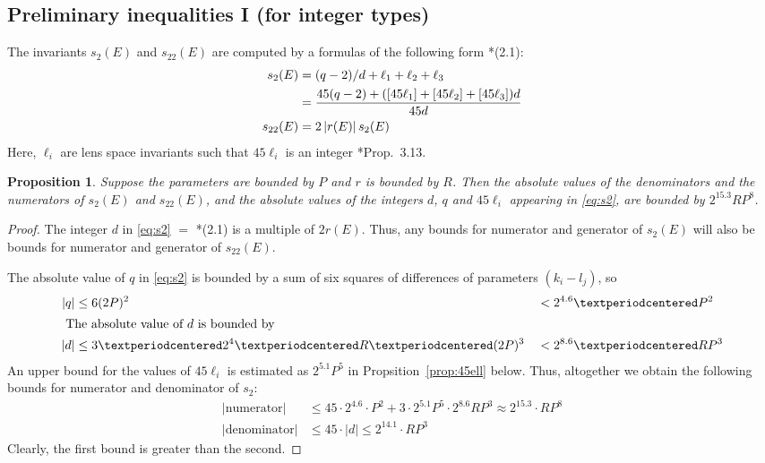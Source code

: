 \documentclass{article}
\newtheorem{prop}{Proposition}
\newcommand{\abs}[1]{\left|#1\right|}
\begin{document}
\subsection*{Preliminary inequalities I (for integer types)}
The invariants \(s_2(E)\) and \(s_{22}(E)\) are computed by a formulas of the following form \cite{CEZ}*{(2.1)}:
\begin{align}\label{eq:s2}
  \notag  s_2(E)   &= (q-2)/d + \ell_1 + \ell_2 + \ell_3\\
                   &= \frac{45(q-2) + ([45\ell_1] + [45\ell_2] + [45\ell_3])d}{45d}\\
  s_{22}(E) &= 2 \abs{r(E)} s_2(E) 
\end{align}  
Here, \(\ell_i\) are lens space invariants such that \(45\ell_i\) is an integer \cite{CEZ}*{Prop.~3.13}.  

\begin{prop}\label{prop:s2-integers}
  Suppose the parameters are bounded by \(P\) and \(r\) is bounded by \(R\).  Then the absolute values of the denominators and the numerators of \(s_2(E)\) and \(s_{22}(E)\), and the absolute values of the integers \(d\), \(q\) and \(45\ell_i\) appearing in \eqref{eq:s2}, are bounded by \(2^{15.3}RP^8\).
\end{prop}
 
\begin{proof}
The integer \(d\) in \eqref{eq:s2} \(=\) \cite{CEZ}*{(2.1)} is a multiple of \(2r(E)\).  Thus, any bounds for numerator and generator of \(s_2(E)\) will also be bounds for numerator and generator of \(s_{22}(E)\).

The absolute value of \(q\) in \eqref{eq:s2} is bounded by a sum of six squares of differences of parameters \((k_i-l_j)\), so 
\begin{alignat}{7}
  \abs{q}&\leq 6(2P)^2 &&< 2^{4.6}·P^2\\
  \intertext{
  The absolute value of \(d\) is bounded by}
  \abs{d} &\leq 3 · 2^4 · R · (2P)^3 &&< 2^{8.6} · RP^3
\end{alignat}
An upper bound for the values of  \(45\ell_i\) is estimated as \(2^{5.1}P^5\) in  Propsition~\ref{prop:45ell} below. 
Thus, altogether we obtain the following bounds for numerator and denominator of \(s_2\):
\begin{align*}
  \abs{\text{numerator}} &\leq 45·2^{4.6}·P^2 + 3·2^{5.1}P^5·2^{8.6}RP^3 \approx 2^{15.3}·RP^8\\
  \abs{\text{denominator}} &\leq 45·\abs{d} \leq 2^{14.1}· R P^3
\end{align*}
Clearly, the first bound is greater than the second. 
\end{proof}
\end{document}

